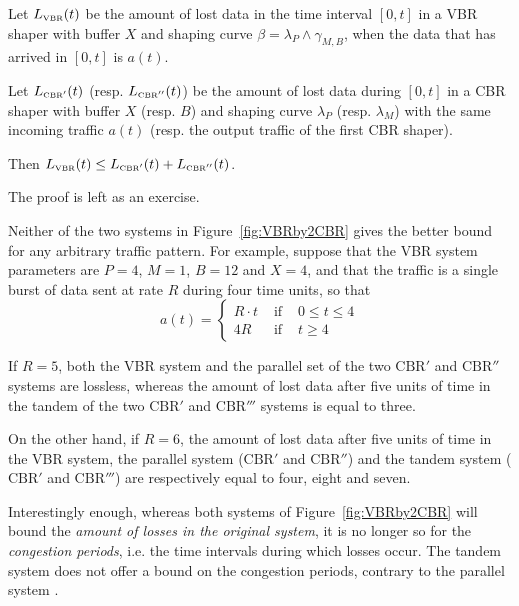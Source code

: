 \begin{theorem} 
Let $L_{\mbox{{\tiny VBR}}}(t)$ be the amount of lost data in the time interval
$[0,t]$ in a VBR shaper
with buffer $X$ and shaping curve $\beta = \lambda_P \wedge \gamma_{M,B}$,
when the data that has arrived in $[0,t]$ is $a(t)$.

Let $L_{\mbox{{\tiny CBR}}^{\prime}}(t)$ (resp. $L_{\mbox{{\tiny CBR}}^{\prime \prime}}(t)$) be the amount of lost data
during $[0,t]$ in a CBR shaper with buffer $X$ (resp. $B$) and
shaping curve $\lambda_P$ (resp. $\lambda_M$) with the same incoming traffic $a(t)$ (resp. the output traffic of
the first CBR shaper).

Then $ L_{\mbox{{\tiny VBR}}}(t) \leq L_{\mbox{{\tiny CBR}}^{\prime}}(t) + L_{\mbox{{\tiny CBR}}^{\prime \prime}}(t)$.
\end{theorem}

The proof is left as an exercise.

Neither of the two systems in Figure~\ref{fig:VBRby2CBR} gives the better
bound for any arbitrary traffic
pattern. For example, suppose that the VBR system parameters are
$P=4$, $M=1$, $B=12$ and $X=4$,
and that the traffic is a single burst of data sent at rate $R$
during four time units, so that
$$a(t) = \left\{ \begin{array}{lll} R \cdot t & \mbox{ if } & 0 \leq t
\leq 4 \\
                  4R &  \mbox{ if } & t \geq 4
                    \end{array} \right.
$$ %

If $R=5$, both the VBR system and the parallel set of the two
$\mathrm{CBR'}$ and $\mathrm{CBR''}$ systems are lossless, whereas
the amount of lost data  after five units of time in the tandem of the
two $\mathrm{CBR'}$ and $\mathrm{CBR'''}$ systems is equal to three.

On the other hand, if $R=6$, the amount of lost data  after five units
of time in the VBR system,
the parallel system ($\mathrm{CBR'}$ and $\mathrm{CBR''}$) and the
tandem system ($\mathrm{CBR'}$ and $\mathrm{CBR'''}$) are
respectively equal to four, eight and seven.

Interestingly enough, whereas both systems of Figure~\ref{fig:VBRby2CBR}
will bound the {\em amount of losses in the original system}, it is no longer so
for the {\em congestion periods}, i.e. the time intervals during which
losses occur. The tandem system does not offer a bound on the congestion periods,
contrary to the parallel system \cite{TimeSpac}.

